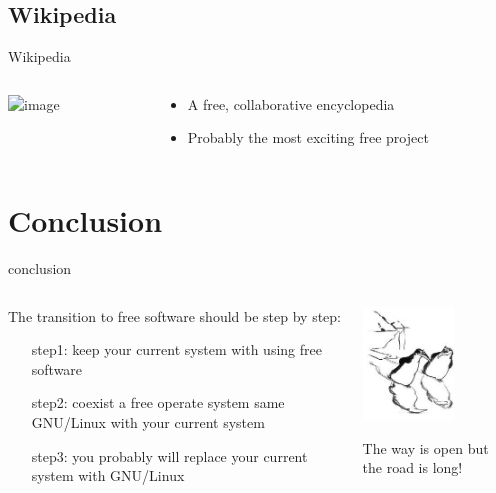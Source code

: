 \documentclass[11pt,hyperref={pdfpagemode=FullScreen}]{beamer}
\begin{document}
\subsection{Wikipedia}
\begin{frame}{Wikipedia}
\begin{columns}

\begin{column}{0.40\textwidth}
\includegraphics<1->[with=2.5cm, height=3cm]{wikipedia}
\end{column}
\begin{column}{0.6\textwidth}

\begin{itemize}

\pause \item A free, collaborative encyclopedia \newline
\pause \item Probably the most exciting free project

\end{itemize}

\end{column}
\end{columns}

\end{frame} 

\section{Conclusion}
\begin{frame}{conclusion}
\begin{columns}
\begin{column}{0.7\textwidth}
The transition to free software should be step by step:
\begin{itemize}
 \item[step1:] keep your current system with using free software
 \item[step2:] coexist a free operate system same \alert {GNU/Linux} with your current system
 \item[step3:] you probably will replace your current system with \alert {GNU/Linux}
\end{itemize}

\end{column}
\begin{column}{0.3\textwidth}
 \includegraphics[with=5cm, height=3cm]{conclusion}
\begin{alertblock}{}
 The way is open but the road is long!
\end{alertblock}

\end{column}

\end{columns} 
\end{frame}
\end{document}
